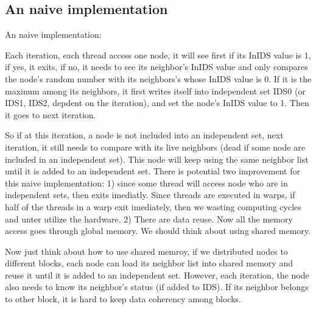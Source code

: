 \documentclass[12pt] {article}
\begin{document}
\subsection{An naive implementation}
An naive implementation: 
\begin{figure}[!tbh]
\centering        
   \caption{ }
   \label{fig:fig1}
\end{figure}

Each iteration, each thread access one node, it will see first if its InIDS value is 1, if yes, it exits, if no, it needs to see its neighbor's InIDS value and only compares the node's random number with its neighbors's whose InIDS value is 0. If it is the maxinum among its neighbors, it first writes itself into independent set IDS0 (or IDS1, IDS2, depdent on the iteration), and set the node's InIDS value to 1. Then it goes to next iteration. 

So if at this iteration, a node is not included into an independent set, next iteration, it still needs to compare with its live neighbors (dead if some node are included in an independent set). This node will keep using the same neighbor list until it is added to an independent set. There is potential two improvement for this naive implementation: 1) since some thread will access node who are in independent sets, then exits imediatly. Since threads are executed in warps, if half of the threads in a warp exit imediately, then we wasting computing cycles and unter utilize the hardware. 2) There are data reuse. Now all the memory access goes through global memory. We should think about using shared memory.

Now just think about how to use shared memroy, if we distributed nodes to different blocks, each node can load its neighbor list into shared memory and reuse it until it is added to an independent set. However, each iteration, the node also needs to know its neighbor's status (if added to IDS). If its neighbor belongs to other block, it is hard to keep data coherency among blocks. 
\end{document}
